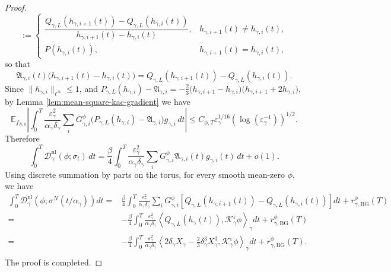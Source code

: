 \documentclass{article}
\begin{document}
\begin{proof}
\[:=
\begin{cases}
\dfrac{
Q_{\gamma,L}(h_{\gamma,i+1}(t))
-
Q_{\gamma,L}(h_{\gamma,i}(t))
}{
h_{\gamma,i+1}(t)-h_{\gamma,i}(t)
},
& h_{\gamma,i+1}(t)\neq h_{\gamma,i}(t),
\\[1.2em]
P(h_{\gamma,i}(t)),
& h_{\gamma,i+1}(t)=h_{\gamma,i}(t),
\end{cases}
\]
so that
\[
\mathfrak A_{\gamma,i}(t)
\bigl(h_{\gamma,i+1}(t)-h_{\gamma,i}(t)\bigr)
=
Q_{\gamma,L}(h_{\gamma,i+1}(t))
-
Q_{\gamma,L}(h_{\gamma,i}(t)).
\]
Since \(\|h_{\gamma,i}\|_{\ell^{\infty}}\le1\), and 
\(
P_{\gamma,L}(h_{\gamma,i})-\mathfrak A_{\gamma,i}
= -\frac23
\bigl(h_{\gamma,i+1}-h_{\gamma,i}\bigr)
\bigl(h_{\gamma,i+1}+2h_{\gamma,i}\bigr),
\)
by Lemma \ref{lem:mean-square-kac-gradient} we have
\begin{equation}
    \mathbb E_{f_{N,0}}
\left|
\int_0^T
\frac{\varepsilon_\gamma^2}{\alpha_\gamma\delta_\gamma}
\sum_iG_{\gamma,i}^{\phi}
\bigl(P_{\gamma,L}(h_{\gamma,i})-\mathfrak A_{\gamma,i}\bigr)
g_{\gamma,i}\,dt
\right|  \le C_{\phi,T} \varepsilon^{1/16}_{\gamma}\left(\log(\varepsilon^{-1}_{\gamma})\right)^{1/2}.
\end{equation}
Therefore
\[
\int_0^T
\mathcal D_\gamma^{\mathrm{nl}}(\phi;\sigma_t)\,dt
=
\frac{\beta}{4}
\int_0^T
\frac{\varepsilon_\gamma^2}{\alpha_\gamma\delta_\gamma}
\sum_iG_{\gamma,i}^{\phi}
\mathfrak A_{\gamma,i}(t)g_{\gamma,i}(t)\,dt
+o(1).
\]
Using discrete summation by parts on the torus, for every smooth mean-zero \(\phi\), we have
\[
\begin{aligned}
 \int_0^T \mathcal D_\gamma^{\mathrm{nl}}(\phi;\sigma^N(t/\alpha_\gamma))dt = &
\frac{\beta}{4}
\int_0^T
\frac{\varepsilon_\gamma^2}{\alpha_\gamma\delta_\gamma}
\sum_i
G_{\gamma,i}^{\phi}
\left[
Q_{\gamma,L}(h_{\gamma,i+1}(t)) - Q_{\gamma,L}(h_{\gamma,i}(t))
\right]dt + r_{\gamma,\mathrm{BG}}^\phi(T)\\
= & -\frac{\beta}{4}
\int_0^T
\frac{\varepsilon_\gamma^2}{\alpha_\gamma\delta_\gamma}
\left\langle
Q_{\gamma,L}(h_\gamma(t)),
\mathcal K_\gamma^\varepsilon\phi
\right\rangle_\gamma dt
+ r_{\gamma,\mathrm{BG}}^\phi(T) \\
= & -\frac{\beta}{4}
\int_0^T \frac{\varepsilon_\gamma^2}{\alpha_\gamma\delta_\gamma}
\left\langle
2 \delta_\gamma X_\gamma
 -\frac{2}{3}\delta_\gamma^3X_\gamma^3,
\mathcal K_\gamma^\varepsilon\phi
\right\rangle_\gamma dt
+ r_{\gamma,\mathrm{BG}}^\phi(T). \\
\end{aligned}
\]
The proof is completed.
\end{proof}
\end{document}
